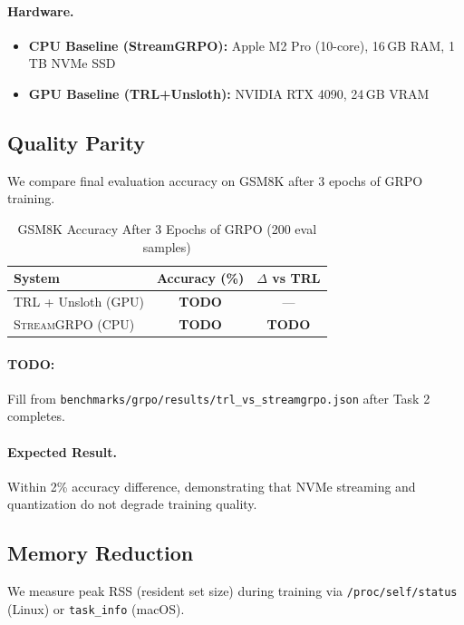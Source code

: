 \documentclass[sigconf,review,anonymous]{acmart}
\begin{document}
\paragraph{Hardware.}
\begin{itemize}
\item \textbf{CPU Baseline (StreamGRPO):} Apple M2 Pro (10-core), 16\,GB RAM, 1\,TB NVMe SSD
\item \textbf{GPU Baseline (TRL+Unsloth):} NVIDIA RTX 4090, 24\,GB VRAM
\end{itemize}

\subsection{Quality Parity}
\label{sec:eval:quality}

We compare final evaluation accuracy on GSM8K after 3 epochs of GRPO training.

\begin{table}[h]
\centering
\caption{GSM8K Accuracy After 3 Epochs of GRPO (200 eval samples)}
\label{tab:accuracy}
\begin{tabular}{lcc}
\toprule
\textbf{System} & \textbf{Accuracy (\%)} & \textbf{$\Delta$ vs TRL} \\
\midrule
TRL + Unsloth (GPU) & \textbf{TODO} & --- \\
\textsc{StreamGRPO} (CPU) & \textbf{TODO} & \textbf{TODO} \\
\bottomrule
\end{tabular}
\end{table}

\paragraph{TODO:} Fill from \texttt{benchmarks/grpo/results/trl\_vs\_streamgrpo.json} after Task 2 completes.

\paragraph{Expected Result.} Within 2\% accuracy difference, demonstrating that NVMe streaming and quantization do not degrade training quality.

\subsection{Memory Reduction}
\label{sec:eval:memory}

We measure peak RSS (resident set size) during training via \texttt{/proc/self/status} (Linux) or \texttt{task\_info} (macOS).
\end{document}

